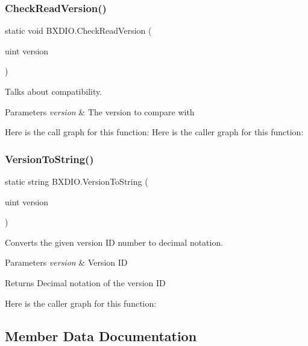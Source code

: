 \subsubsection{\texorpdfstring{Check\+Read\+Version()}{CheckReadVersion()}}
{\footnotesize\ttfamily static void B\+X\+D\+I\+O.\+Check\+Read\+Version (\begin{DoxyParamCaption}\item[{uint}]{version }\end{DoxyParamCaption})\hspace{0.3cm}{\ttfamily [static]}}



Talks about compatibility. 


\begin{DoxyParams}{Parameters}
{\em version} & The version to compare with\\
\hline
\end{DoxyParams}
Here is the call graph for this function\+:
Here is the caller graph for this function\+:
\mbox{\label{class_b_x_d_i_o_acb44b034d14e68cf66c3bcd4b0eb0fc0}} 
\subsubsection{\texorpdfstring{Version\+To\+String()}{VersionToString()}}
{\footnotesize\ttfamily static string B\+X\+D\+I\+O.\+Version\+To\+String (\begin{DoxyParamCaption}\item[{uint}]{version }\end{DoxyParamCaption})\hspace{0.3cm}{\ttfamily [static]}}



Converts the given version ID number to decimal notation. 


\begin{DoxyParams}{Parameters}
{\em version} & Version ID\\
\hline
\end{DoxyParams}
\begin{DoxyReturn}{Returns}
Decimal notation of the version ID
\end{DoxyReturn}
Here is the caller graph for this function\+:


\subsection{Member Data Documentation}
\mbox{\label{class_b_x_d_i_o_a5ab1de22d4eecd8734b698648875e972}} 
